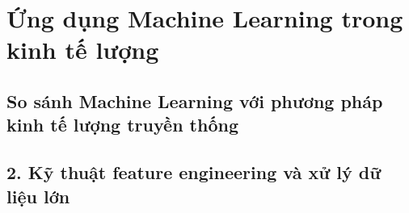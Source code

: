 \chapter{Ứng dụng Machine Learning trong kinh tế lượng}
\section{So sánh Machine Learning với phương pháp kinh tế lượng truyền thống}
\section{2.	Kỹ thuật feature engineering và xử lý dữ liệu lớn}